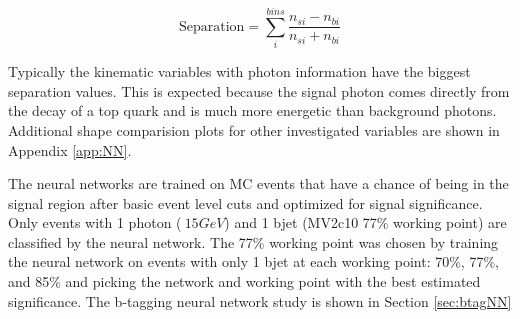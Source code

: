 \[ \text{Separation} = \sum_{i}^{bins} \frac {n_{s i}-n_{b i}}{n_{s i}+n_{b i}}\]

Typically the kinematic variables with photon information have the biggest separation values.  This is expected because the signal photon comes directly from the decay of a top quark and is much more energetic than background photons.  Additional shape comparision plots for other investigated variables are shown in Appendix \ref{app:NN}. 

The neural networks are trained on MC events that have a chance of being in the signal region after basic event level cuts and optimized for signal significance.  Only events with 1 photon ($\>15 GeV$) and 1 bjet (MV2c10 77\% working point) are classified by the neural network.  The 77\% working point was chosen by training the neural network on events with only 1 bjet at each working point: 70\%, 77\%, and 85\% and picking the network and working point with the best estimated significance.  The b-tagging neural network study is shown in Section \ref{sec:btagNN}

